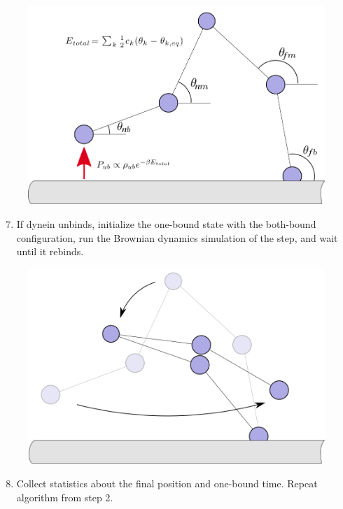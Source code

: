 \begin{figure}[H]
\centering
\includegraphics[width=0.8\columnwidth]{Figures/montecarlo4.png}
\label{fig:mc4}
\end{figure}

\newpage

\begin{enumerate}
	\setcounter{enumi}{6}
	\item If dynein unbinds, initialize the one-bound state with the both-bound configuration, run the Brownian dynamics simulation of the step, and wait until it rebinds.
\end{enumerate}

\begin{figure}[H]
\centering
\includegraphics[width=0.7\columnwidth]{Figures/montecarlo5.png}
\label{fig:mc4}
\end{figure}

\begin{enumerate}
	\setcounter{enumi}{7}
	\item Collect statistics about the final position and one-bound time. Repeat algorithm from step 2. 
\end{enumerate}

